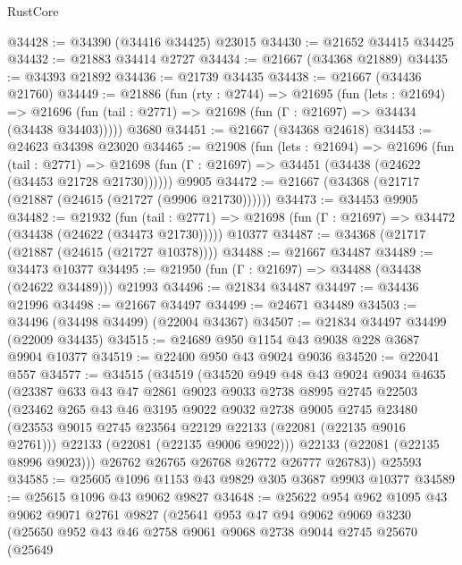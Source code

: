 \begin{lexlean}{RustCore}
\begin{coremodule}
@34428 := @34390 (@34416 @34425) @23015
@34430 := @21652 @34415 @34425
@34432 := @21883 @34414 @2727
@34434 := @21667 (@34368 @21889)
@34435 := @34393 @21892
@34436 := @21739 @34435
@34438 := @21667 (@34436 @21760)
@34449 := @21886
    (fun (rty : @2744) =>
    @21695
      (fun (lets : @21694) =>
      @21696 (fun (tail : @2771) => @21698 (fun (Γ : @21697) => @34434 (@34438 @34403)))))
    @3680
@34451 := @21667 (@34368 @24618)
@34453 := @24623 @34398 @23020
@34465 := @21908
    (fun (lets : @21694) =>
    @21696
      (fun (tail : @2771) =>
      @21698 (fun (Γ : @21697) => @34451 (@34438 (@24622 (@34453 @21728 @21730))))))
    @9905
@34472 := @21667 (@34368 (@21717 (@21887 (@24615 (@21727 (@9906 @21730))))))
@34473 := @34453 @9905
@34482 := @21932
    (fun (tail : @2771) => @21698 (fun (Γ : @21697) => @34472 (@34438 (@24622 (@34473 @21730)))))
    @10377
@34487 := @34368 (@21717 (@21887 (@24615 (@21727 @10378))))
@34488 := @21667 @34487
@34489 := @34473 @10377
@34495 := @21950 (fun (Γ : @21697) => @34488 (@34438 (@24622 @34489))) @21993
@34496 := @21834 @34487
@34497 := @34436 @21996
@34498 := @21667 @34497
@34499 := @24671 @34489
@34503 := @34496 (@34498 @34499) (@22004 @34367)
@34507 := @21834 @34497 @34499 (@22009 @34435)
@34515 := @24689 @950 @1154 @43 @9038 @228 @3687 @9904 @10377
@34519 := @22400 @950 @43 @9024 @9036
@34520 := @22041 @557
@34577 := @34515
    (@34519
      (@34520
        @949
        @48
        @43
        @9024
        @9034
        @4635
        (@23387
          @633
          @43
          @47
          @2861
          @9023
          @9033
          @2738
          @8995
          @2745
          @22503
          (@23462
            @265
            @43
            @46
            @3195
            @9022
            @9032
            @2738
            @9005
            @2745
            @23480
            (@23553 @9015 @2745 @23564 @22129 @22133 (@22081 (@22135 @9016 @2761)))
            @22133
            (@22081 (@22135 @9006 @9022)))
          @22133
          (@22081 (@22135 @8996 @9023)))
        @26762
        @26765
        @26768
        @26772
        @26777
        @26783))
    @25593
@34585 := @25605 @1096 @1153 @43 @9829 @305 @3687 @9903 @10377
@34589 := @25615 @1096 @43 @9062 @9827
@34648 := @25622
    @954
    @962
    @1095
    @43
    @9062
    @9071
    @2761
    @9827
    (@25641
      @953
      @47
      @94
      @9062
      @9069
      @3230
      (@25650
        @952
        @43
        @46
        @2758
        @9061
        @9068
        @2738
        @9044
        @2745
        @25670
        (@25649

\end{coremodule}
\end{lexlean}
